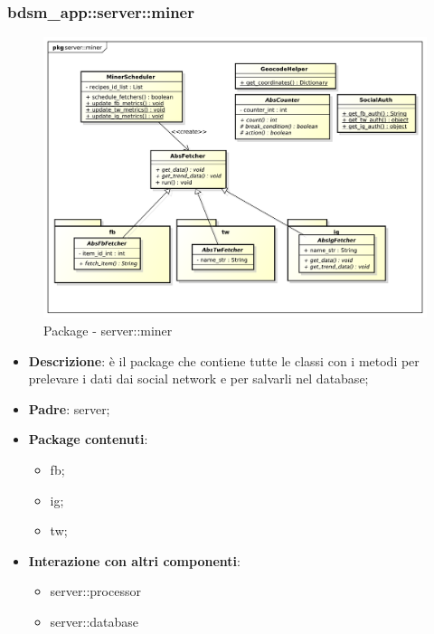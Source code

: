 


\subsubsection{bdsm\_app::server::miner} %
\label{ssub:bdsm_app_server_miner}
\begin{figure}[htbp]
	\centering
	\centerline{\includegraphics[scale=0.4]{./images/server/miner.pdf}}
	\caption{Package - server::miner}
\end{figure}

\begin{itemize}
  \item \textbf{Descrizione}: è il package che contiene tutte le classi con i metodi per prelevare i dati dai social network e per salvarli nel database;
  \item \textbf{Padre}: server;
  \item \textbf{Package contenuti}:
  	\begin{itemize}
  		\item fb;
  		\item ig;
  		\item tw;
  	\end{itemize}
  \item \textbf{Interazione con altri componenti}:
  	\begin{itemize}
  		\item server::processor
  		\item server::database
  	\end{itemize}
\end{itemize}

